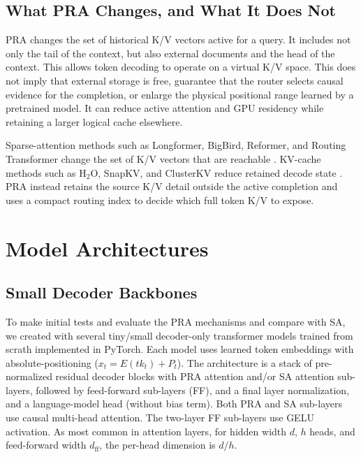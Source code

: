\documentclass[11pt]{article}
\begin{document}
\subsection{What PRA Changes, and What It Does Not}

PRA changes the set of historical K/V vectors active for a query.
It includes not only the tail of the context, but also external documents and the head
of the context. This allows token decoding to operate on a virtual K/V space.
This does not imply that external storage is free, guarantee that the router selects causal
evidence for the completion, or enlarge the physical positional range learned by a pretrained model.
It can reduce active attention and GPU residency while retaining a larger logical cache
elsewhere. 

Sparse-attention methods such as Longformer, BigBird, Reformer,
and Routing Transformer change the set of K/V vectors that are reachable
\cite{beltagy2020longformer,zaheer2020bigbird,kitaev2020reformer,roy2021routing}.
KV-cache methods such as H$_2$O, SnapKV, and ClusterKV reduce retained decode state
\cite{zhang2023h2o,li2024snapkv,liu2024clusterkv}. PRA instead retains the source K/V detail outside
the active completion and uses a compact routing index to decide which full token K/V to expose.

\section{Model Architectures}
\label{sec:models}

\subsection{Small Decoder Backbones}

To make initial tests and evaluate the PRA mechanisms and compare with SA, we
created with several tiny/small decoder-only transformer models trained from scrath implemented in PyTorch.
Each model uses learned token embeddings with absolute-positioning ($x_t = E(tk_t)+P_t $).
The architecture is a stack of pre-normalized residual
decoder blocks with PRA attention and/or SA attention sub-layers, followed by
feed-forward sub-layers (FF), and a final layer normalization,
and a language-model head (without bias term). 
Both PRA and SA sub-layers use causal multi-head attention. 
The two-layer FF sub-layers use GELU activation.
As most common in attention layers, for hidden width $d$, $h$ heads, and feed-forward width $d_{\mathrm{ff}}$,
the per-head dimension is $d/h$.
\end{document}
